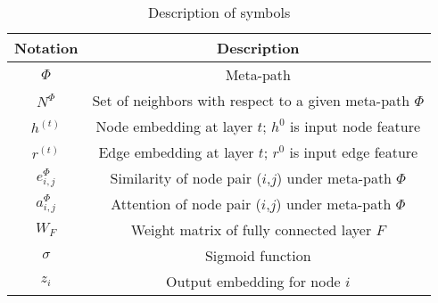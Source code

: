 \begin{table}[]
\caption{Description of symbols}
\centering
\begin{tabular}{cc}
\hline
Notation       & Description                                                       \\ \hline
$\Phi$         & Meta-path                                                         \\
$N^\Phi$       & Set of neighbors with respect to a given meta-path $\Phi$          \\
$h^{(t)}$        & Node embedding at layer $t$; $h^0$ is input node feature \\
$r^{(t)}$        & Edge embedding at layer $t$; $r^0$ is input edge feature \\
$e_{i,j}^\Phi$ & Similarity of node pair ($i$,$j$) under meta-path $\Phi$   \\
$a_{i,j}^\Phi$ & Attention of node pair ($i$,$j$) under meta-path $\Phi$    \\
$W_F$          & Weight matrix of fully connected layer $F$          \\
$\sigma$       & Sigmoid function                                                  \\
$z_i$            & Output embedding for node $i$                                     \\
\hline
\end{tabular}
\label{table:notation}
\end{table}











